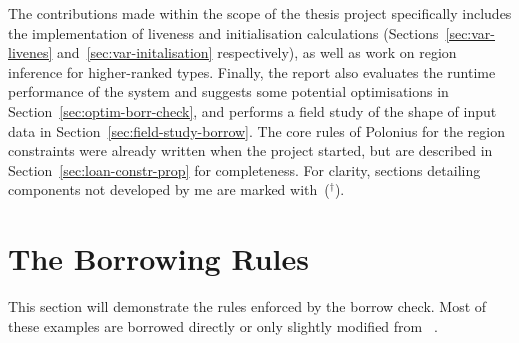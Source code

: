 \documentclass[11pt,a4paper,twoside,openany]{report}
\newcommand{\notmine}[0] {$^\dagger$}
\begin{document}
The contributions made within the scope of the thesis project specifically
includes the implementation of liveness and initialisation calculations
(Sections~\ref{sec:var-livenes} and~\ref{sec:var-initalisation} respectively),
as well as work on region inference for higher-ranked types. Finally, the report
also evaluates the runtime performance of the system and suggests some potential
optimisations in Section~\ref{sec:optim-borr-check}, and performs a field study
of the shape of input data in Section~\ref{sec:field-study-borrow}. The core
rules of Polonius for the region constraints were already written when the
project started, but are described in Section~\ref{sec:loan-constr-prop} for
completeness. For clarity, sections detailing components not developed by me are
marked with~(\notmine{}).

\section{The Borrowing Rules}\label{sec:borrowing-rules}
This section will demonstrate the rules enforced by the borrow check. Most of
these examples are borrowed directly or only slightly modified from
\citeauthor{weiss_oxide:_2019}~\cite{weiss_oxide:_2019}.
\end{document}
